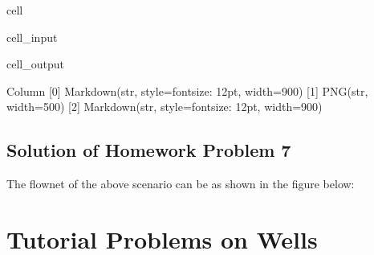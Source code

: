\documentclass[letterpaper,10pt,english]{jupyterBook}
\let\sphinxpxdimen\pdfpxdimen\else\newdimen\sphinxpxdimen
\begin{document}
\begin{sphinxuseclass}{cell}
\begin{sphinxVerbatimInput}
\begin{sphinxuseclass}{cell_input}
\end{sphinxuseclass}\end{sphinxVerbatimInput}
\begin{sphinxVerbatimOutput}

\begin{sphinxuseclass}{cell_output}
\begin{sphinxVerbatim}[commandchars=\\\{\}]
Column
    [0] Markdown(str, style=\PYGZob{}\PYGZsq{}font\PYGZhy{}size\PYGZsq{}: \PYGZsq{}12pt\PYGZsq{}\PYGZcb{}, width=900)
    [1] PNG(str, width=500)
    [2] Markdown(str, style=\PYGZob{}\PYGZsq{}font\PYGZhy{}size\PYGZsq{}: \PYGZsq{}12pt\PYGZsq{}\PYGZcb{}, width=900)
\end{sphinxVerbatim}

\end{sphinxuseclass}\end{sphinxVerbatimOutput}

\end{sphinxuseclass}

\subsection{Solution of Homework Problem 7}
\label{\detokenize{content/tutorials/T7/tutorial_07:solution-of-homework-problem-7}}
\sphinxAtStartPar
The flow\sphinxhyphen{}net of the above scenario can be as shown in the figure below:

\noindent{\hspace*{\fill}\sphinxincludegraphics[width=600\sphinxpxdimen]{{T07_fH8}.png}\hspace*{\fill}}


\section{Tutorial Problems on Wells}
\label{\detokenize{content/tutorials/T7/tutorial_07:tutorial-problems-on-wells}}
\end{document}
